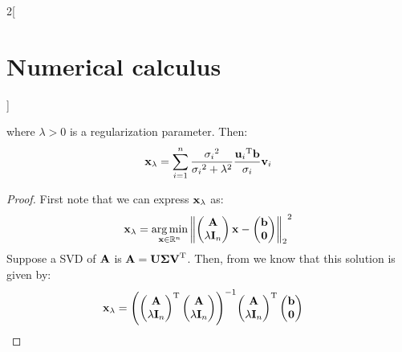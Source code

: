 \documentclass[../../../main_math.tex]{subfiles}
\begin{document}
\begin{multicols}{2}[\section{Numerical calculus}]
\begin{proposition}
$$    $$
    where $\lambda>0$ is a regularization parameter. Then:
    $$
      \boldsymbol{\mathrm{x}}_\lambda=\sum_{i=1}^{n}\frac{{\sigma_i}^2}{{\sigma_i}^2+\lambda^2} \frac{{\boldsymbol{\mathrm{u}}_i}^{\mathrm{T}}\boldsymbol{\mathrm{b}}}{\sigma_i}\boldsymbol{\mathrm{v}}_i
    $$
  \end{proposition}
  \begin{proof}
    First note that we can express $\boldsymbol{\mathrm{x}}_\lambda$ as:
    $$
      \boldsymbol{\mathrm{x}}_\lambda = \operatorname*{arg\,min}_{\boldsymbol{\mathrm{x}}\in\mathbb{R}^n}{\left\|\begin{pmatrix}
            \boldsymbol{\mathrm{A}} \\
            \lambda\boldsymbol{\mathrm{I}}_n
          \end{pmatrix} \boldsymbol{\mathrm{x}}-\begin{pmatrix}
            \boldsymbol{\mathrm{b}} \\
            \boldsymbol{\mathrm{0}}
          \end{pmatrix}\right\|_2}^2
    $$
    Suppose a SVD of $\boldsymbol{\mathrm{A}}$ is $\boldsymbol{\mathrm{A}}= \boldsymbol{\mathrm{U}}\boldsymbol{\mathrm{\Sigma}}{\boldsymbol{\mathrm{V}}}^{\mathrm{T}}$. Then, from  we know that this solution is given by:
    \begin{align*}
      \boldsymbol{\mathrm{x}}_\lambda & ={\left({\begin{pmatrix}
                                              \boldsymbol{\mathrm{A}} \\
                                              \lambda\boldsymbol{\mathrm{I}}_n
                                            \end{pmatrix}}^{\mathrm{T}}\begin{pmatrix}
                                                          \boldsymbol{\mathrm{A}} \\
                                                          \lambda\boldsymbol{\mathrm{I}}_n
                                                        \end{pmatrix}\right)}^{-1}{\begin{pmatrix}
                                                                                                 \boldsymbol{\mathrm{A}} \\
                                                                                                 \lambda\boldsymbol{\mathrm{I}}_n
                                                                                               \end{pmatrix}}^{\mathrm{T}}\begin{pmatrix}
                                                                                                             \boldsymbol{\mathrm{b}} \\
                                                                                                             \boldsymbol{\mathrm{0}}

\end{pmatrix}
\end{align*}
\end{proof}
\end{multicols}
\end{document}
